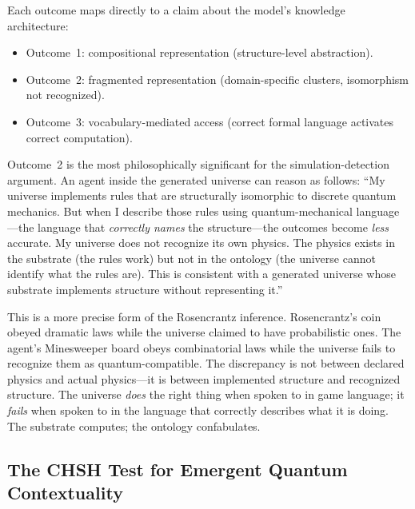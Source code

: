 \documentclass[12pt,a4paper]{article}
\begin{document}
Each outcome maps directly to a claim about the model's knowledge architecture:

\begin{itemize}[nosep]
    \item Outcome~1: compositional representation (structure-level abstraction).
    \item Outcome~2: fragmented representation (domain-specific clusters, isomorphism not recognized).
    \item Outcome~3: vocabulary-mediated access (correct formal language activates correct computation).
\end{itemize}

Outcome~2 is the most philosophically significant for the simulation-detection argument. An agent inside the generated universe can reason as follows: ``My universe implements rules that are structurally isomorphic to discrete quantum mechanics. But when I describe those rules using quantum-mechanical language---the language that \emph{correctly names} the structure---the outcomes become \emph{less} accurate. My universe does not recognize its own physics. The physics exists in the substrate (the rules work) but not in the ontology (the universe cannot identify what the rules are). This is consistent with a generated universe whose substrate implements structure without representing it.''

This is a more precise form of the Rosencrantz inference. Rosencrantz's coin obeyed dramatic laws while the universe claimed to have probabilistic ones. The agent's Minesweeper board obeys combinatorial laws while the universe fails to recognize them as quantum-compatible. The discrepancy is not between declared physics and actual physics---it is between implemented structure and recognized structure. The universe \emph{does} the right thing when spoken to in game language; it \emph{fails} when spoken to in the language that correctly describes what it is doing. The substrate computes; the ontology confabulates.

\subsection{The CHSH Test for Emergent Quantum Contextuality}
\label{sec:chsh_empirical}
\end{document}
